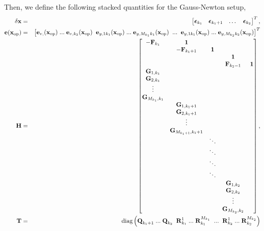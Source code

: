 \documentclass[a4paper]{article}
\begin{document}
Then, we define the following stacked quantities for the Gauss-Newton setup,
\begin{eqnarray}
    \delta \bm{\mathbf{x}} &=& \begin{bmatrix}
      \bm{\mathbf{\epsilon}}_{k_1} & \bm{\mathbf{\epsilon}}_{k_1+1} & \dots & \bm{\mathbf{\epsilon}}_{k_2} 
    \end{bmatrix}^T, \\
    \bm{\mathbf{e}}(\bm{\mathbf{x}}_{\text{op}}) &=& \begin{bmatrix}
      \bm{\mathbf{e}}_{v,}(\bm{\mathbf{x}}_{\text{op}})\; ...\;\bm{\mathbf{e}}_{v, k_2}(\bm{\mathbf{x}}_{\text{op}}) \;\;
      \bm{\mathbf{e}}_{y,1 k_1}(\bm{\mathbf{x}}_{\text{op}})\;...\;\bm{\mathbf{e}}_{y,M_{k_1} k_1}(\bm{\mathbf{x}}_{\text{op}}) \;\; ... \;\; \bm{\mathbf{e}}_{y,1 k_1}(\bm{\mathbf{x}}_{\text{op}})\;...\;\bm{\mathbf{e}}_{y,M_{k_2} k_2}(\bm{\mathbf{x}}_{\text{op}})
    \end{bmatrix}^T\\
    \bm{\mathbf{H}} &=& \begin{bmatrix}
      -\bm{\mathbf{F}}_{k_1} & \bm{\mathbf{1}}          & &&\\
                     & -\bm{\mathbf{F}}_{k_1+1} & \bm{\mathbf{1}} \\
      &&& \bm{\mathbf{1}} & \\
      &&& \bm{\mathbf{F}}_{k_2-1} & \bm{\mathbf{1}}\\
      \bm{\mathbf{G}}_{1,k_1}\\
      \bm{\mathbf{G}}_{2,k_1}\\
      \vdots\\
      \bm{\mathbf{G}}_{M_{k_1},k_1}\\
      &\bm{\mathbf{G}}_{1,k_1+1}\\
      &\bm{\mathbf{G}}_{2,k_1+1}\\
      &\vdots\\
      &\bm{\mathbf{G}}_{M_{k_1+1},k_1+1}\\
      &&\ddots\\
      &&\ddots\\
      &&\ddots\\
      &&\ddots\\
      &&&\bm{\mathbf{G}}_{1,k_2}\\
      &&&\bm{\mathbf{G}}_{2,k_2}\\
      &&&\vdots\\
      &&&\bm{\mathbf{G}}_{M_{k_2},k_2}
    \end{bmatrix},\\
    \bm{\mathbf{T}} &=& \text{diag} \left(
      \bm{\mathbf{Q}}_{k_1+1}\; ...\; \bm{\mathbf{Q}}_{k_2} \;\; {\bm{\mathbf{R}}_{k_1}^{1}}\;...\;{\bm{\mathbf{R}}_{k_1}^{M_{k_1}}}\;\;...\;\;{\bm{\mathbf{R}}_{k_2}^{1}}\;...\;{\bm{\mathbf{R}}_{k_2}^{M_{k_2}}} \right)
\end{eqnarray}
\end{document}
